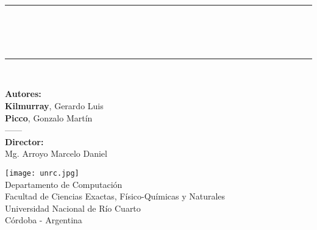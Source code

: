 \newcommand{\HRule}{\rule{\linewidth}{0.6mm}}
\begin{titlepage}

\begin{center}


\vspace*{0.5cm}
\HRule \\
  {\Huge\textbf{\maggen\\}}
\vspace*{0.5cm}
  {\large{\textbf{}}}
\\
 
\HRule \\[0.5cm]



\vspace*{1cm}

\Large{\textbf{Autores:}\\ \textbf{Kilmurray}, Gerardo Luis\\ \textbf{Picco}, Gonzalo Martín\\}
\vspace*{0.6cm}
{------\\}
\vspace*{0.6cm}
\textbf{Director:}\\ Mg. Arroyo Marcelo Daniel

\vspace*{1cm}
 \texttt{[image: unrc.jpg]}\\
\vspace*{0.7cm}
\large{Departamento de Computación\\
       Facultad de Ciencias Exactas, Físico-Químicas y Naturales\\
       Universidad Nacional de Río Cuarto\\
       Córdoba - Argentina}
\end{center}
\end{titlepage}
\sloppy

\titlepage
